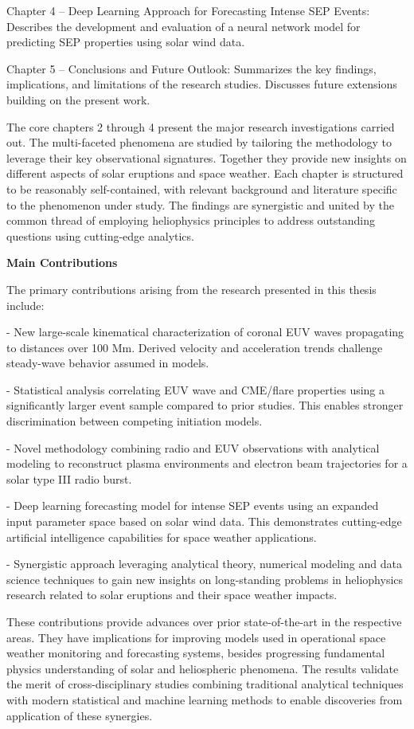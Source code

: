 \documentclass{article}
\begin{document}
Chapter 4 – Deep Learning Approach for Forecasting Intense SEP Events: Describes the development and evaluation of a neural network model for predicting SEP properties using solar wind data.

Chapter 5 – Conclusions and Future Outlook: Summarizes the key findings, implications, and limitations of the research studies. Discusses future extensions building on the present work.

The core chapters 2 through 4 present the major research investigations carried out. The multi-faceted phenomena are studied by tailoring the methodology to leverage their key observational signatures. Together they provide new insights on different aspects of solar eruptions and space weather. Each chapter is structured to be reasonably self-contained, with relevant background and literature specific to the phenomenon under study. The findings are synergistic and united by the common thread of employing heliophysics principles to address outstanding questions using cutting-edge analytics. 


\textbf{Main Contributions}

The primary contributions arising from the research presented in this thesis include:

- New large-scale kinematical characterization of coronal EUV waves propagating to distances over 100 Mm. Derived velocity and acceleration trends challenge steady-wave behavior assumed in models. 

- Statistical analysis correlating EUV wave and CME/flare properties using a significantly larger event sample compared to prior studies. This enables stronger discrimination between competing initiation models.

- Novel methodology combining radio and EUV observations with analytical modeling to reconstruct plasma environments and electron beam trajectories for a solar type III radio burst.

- Deep learning forecasting model for intense SEP events using an expanded input parameter space based on solar wind data. This demonstrates cutting-edge artificial intelligence capabilities for space weather applications.

- Synergistic approach leveraging analytical theory, numerical modeling and data science techniques to gain new insights on long-standing problems in heliophysics research related to solar eruptions and their space weather impacts. 

These contributions provide advances over prior state-of-the-art in the respective areas. They have implications for improving models used in operational space weather monitoring and forecasting systems, besides progressing fundamental physics understanding of solar and heliospheric phenomena. The results validate the merit of cross-disciplinary studies combining traditional analytical techniques with modern statistical and machine learning methods to enable discoveries from application of these synergies.
\end{document}
